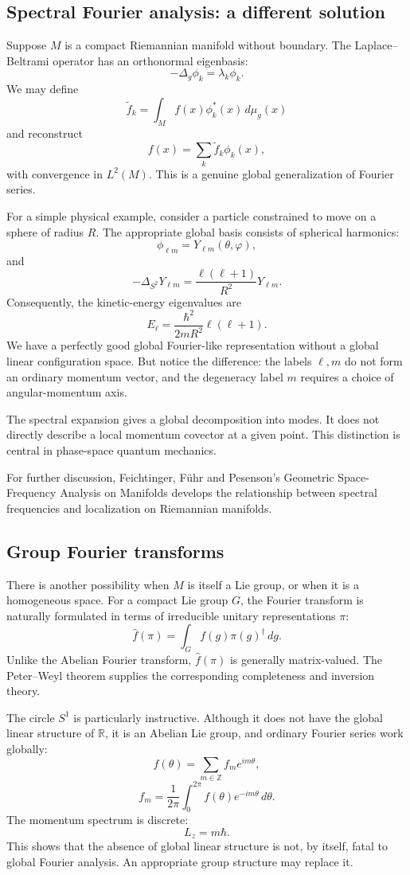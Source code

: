 \subsection{Spectral Fourier analysis: a different solution}
Suppose \(M\) is a compact Riemannian manifold without boundary.
The Laplace–Beltrami operator has an orthonormal eigenbasis:
\[
-\Delta_g\phi_k=\lambda_k\phi_k.
\]
We may define
\[
\widetilde f_k
=
\int_M f(x)\phi_k^*(x)\,d\mu_g(x)
\]
and reconstruct
\[
f(x)=\sum_k\widetilde f_k\phi_k(x),
\]
with convergence in \(L^2(M)\).
This is a genuine global generalization of Fourier series.

For a simple physical example, consider a particle constrained to move on a
sphere of radius \(R\).
The appropriate global basis consists of spherical harmonics:
\[
\phi_{\ell m}=Y_{\ell m}(\theta,\varphi),
\]
and
\[
-\Delta_{S^2}Y_{\ell m}
=
\frac{\ell(\ell+1)}{R^2}Y_{\ell m}.
\]
Consequently, the kinetic-energy eigenvalues are
\[
E_\ell=\frac{\hbar^2}{2mR^2}\ell(\ell+1).
\]
We have a perfectly good global Fourier-like representation without a global
linear configuration space.
But notice the difference: the labels \(\ell,m\) do not form an ordinary
momentum vector, and the degeneracy label \(m\) requires a choice of
angular-momentum axis.

The spectral expansion gives a global decomposition into modes. It does not
directly describe a local momentum covector at a given point.
This distinction is central in phase-space quantum mechanics.

For further discussion, Feichtinger, Führ and Pesenson's Geometric
Space-Frequency Analysis on Manifolds develops the relationship between
spectral frequencies and localization on Riemannian manifolds.

\subsection{Group Fourier transforms}
There is another possibility when \(M\) is itself a Lie group, or when it is a
homogeneous space.
For a compact Lie group \(G\), the Fourier transform is naturally formulated in
terms of irreducible unitary representations \(\pi\):
\[
\widehat f(\pi)
=
\int_G f(g)\pi(g)^\dagger\,dg.
\]
Unlike the Abelian Fourier transform, \(\widehat f(\pi)\) is generally
matrix-valued.
The Peter–Weyl theorem supplies the corresponding completeness and inversion
theory.

The circle \(S^1\) is particularly instructive. Although it does not have the
global linear structure of \(\mathbb R\), it is an Abelian Lie group, and
ordinary Fourier series work globally:
\[
f(\theta)=\sum_{m\in\mathbb Z}f_m e^{im\theta},
\]
\[
f_m=\frac{1}{2\pi}
\int_0^{2\pi}f(\theta)e^{-im\theta}\,d\theta.
\]
The momentum spectrum is discrete:
\[
L_z=m\hbar.
\]
This shows that the absence of global linear structure is not, by itself, fatal
to global Fourier analysis. An appropriate group structure may replace it.

